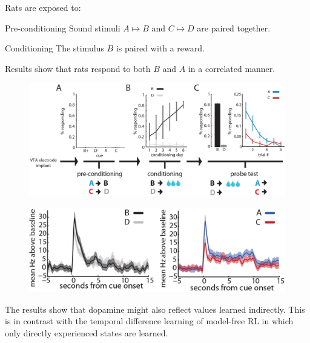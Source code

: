 \begin{casestudy}
    Rats are exposed to:
    \begin{descriptionlist}
        \item[Pre-conditioning] Sound stimuli $A \mapsto B$ and $C \mapsto D$ are paired together.
        \item[Conditioning] The stimulus $B$ is paired with a reward. 
    \end{descriptionlist}
    Results show that rats respond to both $B$ and $A$ in a correlated manner.

    \begin{figure}[H]
        \centering
        \includegraphics[width=0.65\linewidth]{./img/dopamine_indirect1.png}
    \end{figure}

    \begin{figure}[H]
        \centering
        \includegraphics[width=0.45\linewidth]{./img/dopamine_indirect2.png}
    \end{figure}

    The results show that dopamine might also reflect values learned indirectly.
    This is in contrast with the temporal difference learning of model-free RL in which only directly experienced states are learned.
\end{casestudy}

